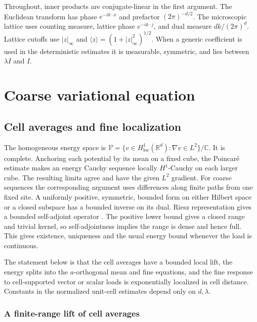 \documentclass[11pt]{article}
\begin{document}
Throughout, inner products are conjugate-linear in the first argument. The Euclidean transform has phase \(e^{-ik\cdot x}\) and prefactor \((2\pi)^{-d/2}\). The microscopic lattice uses counting measure, lattice phase \(e^{-ik\cdot j}\), and dual measure \(dk/(2\pi)^d\). Lattice cutoffs use \(|z|_\infty\) and \(\langle z\rangle=(1+|z|_\infty^2)^{1/2}\). When a generic coefficient is used in the deterministic estimates it is measurable, symmetric, and lies between \(\lambda I\) and \(I\).

\section{Coarse variational equation}\label{sec:fine}

\subsection{Cell averages and fine localization}\label{subsec:fine}

The homogeneous energy space is \(\mathscr V=\{v\in H^1_{\mathrm{loc}}(\mathbb R^d):\nabla v\in L^2\}/\mathbb C\). It is complete. Anchoring each potential by its mean on a fixed cube, the Poincaré estimate makes an energy Cauchy sequence locally \(H^1\)-Cauchy on each larger cube. The resulting limits agree and have the given \(L^2\) gradient. For coarse sequences the corresponding argument uses differences along finite paths from one fixed site. A uniformly positive, symmetric, bounded form on either Hilbert space or a closed subspace has a bounded inverse on its dual. Riesz representation gives a bounded self-adjoint operator \cite[Theorem 1]{TaoHilbert}. The positive lower bound gives a closed range and trivial kernel, so self-adjointness implies the range is dense and hence full. This gives existence, uniqueness and the usual energy bound whenever the load is continuous.

The statement below is that the cell averages have a bounded local lift, the energy splits into the \(a\)-orthogonal mean and fine equations, and the fine response to cell-supported vector or scalar loads is exponentially localized in cell distance. Constants in the normalized unit-cell estimates depend only on \(d,\lambda\).

\subsubsection{A finite-range lift of cell averages}\label{a-finite-range-lift-of-cell-averages}
\end{document}
